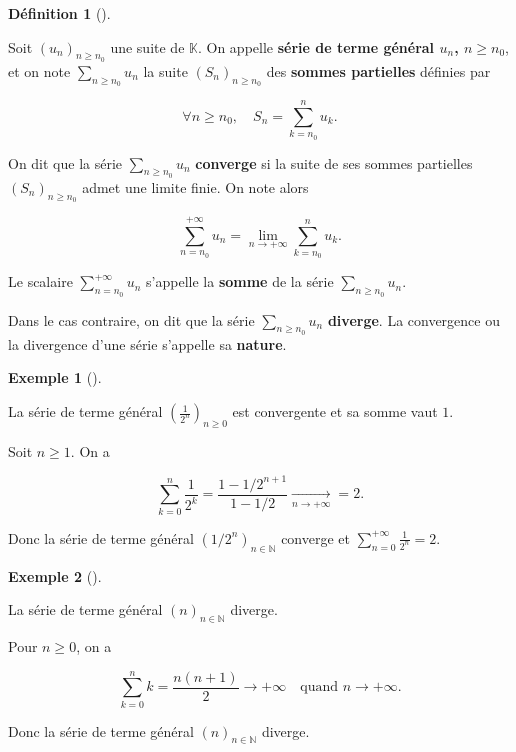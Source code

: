 \documentclass[
  french,
  letterpaper,
  DIV=11,
  numbers=noendperiod]{scrreprt}
\theoremstyle{plain}
\theoremstyle{definition}
\newtheorem{definition}{Définition}[chapter]
\theoremstyle{plain}
\theoremstyle{plain}
\theoremstyle{definition}
\theoremstyle{definition}
\newtheorem{example}{Exemple}[chapter]
\theoremstyle{plain}
\theoremstyle{remark}
\begin{document}
\begin{definition}[]\protect\hypertarget{def-serie}{}\label{def-serie}

Soit \((u_n)_{n\geqslant n_0}\) une suite de \(\mathbb{K}\). On appelle
\textbf{série de terme général \(u_n\), \(n\geqslant n_0\)}, et on note
\(\displaystyle
\sum_{n\geqslant n_0}u_n\) la suite \((S_n)_{n\geqslant n_0}\) des
\textbf{sommes partielles} définies par

\[
\forall n\geqslant n_0,\quad S_n = \sum_{k=n_0}^{n}u_k.
\]

On dit que la série \(\displaystyle \sum_{n\geqslant n_0}u_n\)
\textbf{converge} si la suite de ses sommes partielles
\((S_n)_{n\geqslant n_0}\) admet une limite finie. On note alors

\[
\sum_{n=n_0}^{+\infty}u_n = \lim_{n\to +\infty} \sum_{k=n_0}^{n}u_k.
\]

Le scalaire \(\displaystyle \sum_{n=n_0}^{+\infty}u_n\) s'appelle la
\textbf{somme} de la série \(\displaystyle\sum_{n\geqslant n_0}u_n\).

Dans le cas contraire, on dit que la série
\(\displaystyle\sum_{n\geqslant
n_0}u_n\) \textbf{diverge}. La convergence ou la divergence d'une série
s'appelle sa \textbf{nature}.

\end{definition}

\begin{example}[]\protect\hypertarget{exm-nature-convergente}{}\label{exm-nature-convergente}

La série de terme général \((\frac{1}{2^{n}})_{n \geqslant 0}\) est
convergente et sa somme vaut \(1\).

Soit \(n \geqslant 1\). On a

\[
    \sum_{k=0}^{n} \frac{1}{2^{k}} = \frac{1-1/2^{n+1}}{1-1/2} \underset{n \to + \infty}{\longrightarrow} =2.
\]

Donc la série de terme général \((1/2^{n})_{n\in \mathbb{N}}\) converge
et \(\sum_{n=0}^{+\infty}\frac{1}{2^{n}}=2\).

\end{example}

\begin{example}[]\protect\hypertarget{exm-nature-divergente}{}\label{exm-nature-divergente}

La série de terme général \((n)_{n \in \mathbb{N}}\) diverge.

Pour \(n \geqslant 0\), on a

\[
    \sum_{k=0}^{n} k = \frac{n(n+1)}{2} \to +\infty \quad \text{quand $n
\to +\infty$}.
\]

Donc la série de terme général \((n)_{n \in \mathbb{N}}\) diverge.

\end{example}
\end{document}
